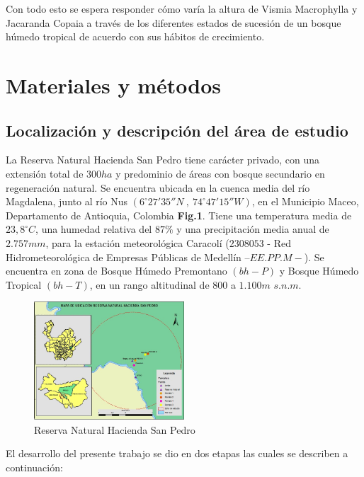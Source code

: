 \documentclass[letterpaper,9pt,twocolumn,twoside,]{pinp}
\begin{document}
Con todo esto se espera responder cómo varía la altura de Vismia
Macrophylla y Jacaranda Copaia a través de los diferentes estados de
sucesión de un bosque húmedo tropical de acuerdo con sus hábitos de
crecimiento.

\hypertarget{materiales-y-muxe9todos}{%
\section{Materiales y métodos}\label{materiales-y-muxe9todos}}

\hypertarget{localizaciuxf3n-y-descripciuxf3n-del-uxe1rea-de-estudio}{%
\subsection{Localización y descripción del área de
estudio}\label{localizaciuxf3n-y-descripciuxf3n-del-uxe1rea-de-estudio}}

La Reserva Natural Hacienda San Pedro tiene carácter privado, con una
extensión total de \(300ha\) y predominio de áreas con bosque secundario
en regeneración natural. Se encuentra ubicada en la cuenca media del río
Magdalena, junto al río Nus
\((6^{\circ} 27'35'' N\ , \ 74^{\circ} 47'15'' W)\), en el Municipio
Maceo, Departamento de Antioquia, Colombia \textbf{Fig.1}. Tiene una
temperatura media de \(23,8^{\circ}C\), una humedad relativa del
\(87\%\) y una precipitación media anual de \(2.757mm\), para la
estación meteorológica Caracolí (\(2308053\) - Red Hidrometeorológica de
Empresas Públicas de Medellín \(–EE.PP.M-\)). Se encuentra en zona de
Bosque Húmedo Premontano \((bh-P)\) y Bosque Húmedo Tropical \((bh-T)\),
en un rango altitudinal de \(800\) a \(1.100m\) \(s.n.m\).

\begin{figure}[h]
  \centering
  \includegraphics[width= 0.5\textwidth]{figure1.jpeg}
  \caption{Reserva Natural Hacienda San Pedro}
\end{figure}

El desarrollo del presente trabajo se dio en dos etapas las cuales se
describen a continuación:
\end{document}
